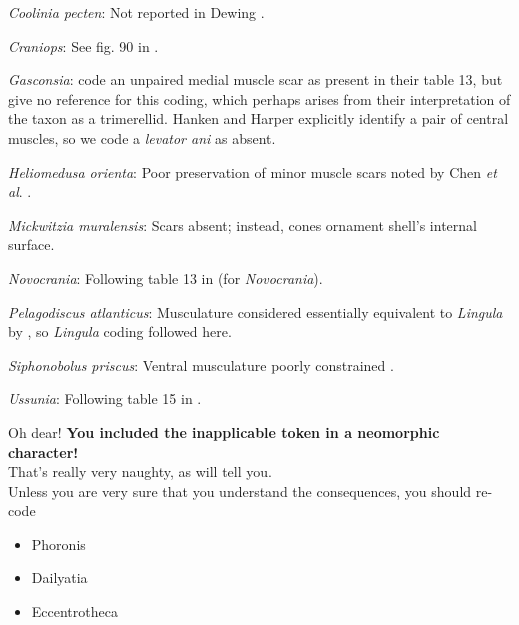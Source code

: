 \documentclass[openany]{book}
\providecommand{\tightlist}{%
  \setlength{\itemsep}{0pt}\setlength{\parskip}{0pt}}
\theoremstyle{definition}
\theoremstyle{definition}
\theoremstyle{definition}
\theoremstyle{remark}
\begin{document}
\hypertarget{Coolinia_pecten-coding-72}{}
\emph{Coolinia pecten}: Not reported in Dewing
\citeyearpar{Dewing2001Hingemodifications}.

\hypertarget{Craniops-coding-72}{}
\emph{Craniops}: See fig. 90 in
\citet{Williams2000LinguliformeaCraniiformea}.

\hypertarget{Gasconsia-coding-72}{}
\emph{Gasconsia}: \citet{Williams2000LinguliformeaCraniiformea} code an
unpaired medial muscle scar as present in their table 13, but give no
reference for this coding, which perhaps arises from their
interpretation of the taxon as a trimerellid. Hanken and Harper
\citeyearpar[p.~249 and text-fig. 2]{Hanken1985Thetaxonomy} explicitly
identify a pair of central muscles, so we code a \emph{levator ani} as
absent.

\hypertarget{Heliomedusa_orienta-coding-72}{}
\emph{Heliomedusa orienta}: Poor preservation of minor muscle scars
noted by Chen \emph{et al}. \citeyearpar{Chen2007Reinterpretationof}.

\hypertarget{Mickwitzia_muralensis-coding-72}{}
\emph{Mickwitzia muralensis}: Scars absent; instead, cones ornament
shell's internal surface.

\hypertarget{Novocrania-coding-72}{}
\emph{Novocrania}: Following table 13 in
\citet{Williams2000LinguliformeaCraniiformea} (for \emph{Novocrania}).

\hypertarget{Pelagodiscus_atlanticus-coding-72}{}
\emph{Pelagodiscus atlanticus}: Musculature considered essentially
equivalent to \emph{Lingula} by
\citet{Williams2000LinguliformeaCraniiformea}, so \emph{Lingula} coding
followed here.

\hypertarget{Siphonobolus_priscus-coding-72}{}
\emph{Siphonobolus priscus}: Ventral musculature poorly constrained
\citep{Williams2000LinguliformeaCraniiformea, Popov2009Earlyontogeny}.

\hypertarget{Ussunia-coding-72}{}
\emph{Ussunia}: Following table 15 in
\citet{Williams2000LinguliformeaCraniiformea}.

Oh dear! \textbf{You included the inapplicable token in a neomorphic
character!}\\
That's really very naughty, as \citet{Brazeau2018} will tell you.\\
Unless you are very sure that you understand the consequences, you
should re-code

\begin{itemize}
\tightlist
\item
  Phoronis\\
\item
  Dailyatia\\
\item
  Eccentrotheca
\end{itemize}
\end{document}
